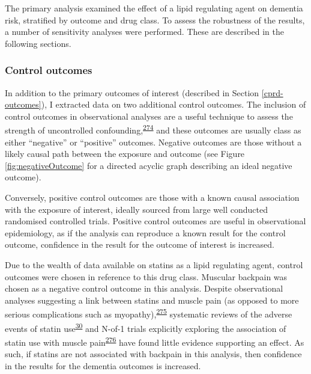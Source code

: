 \documentclass[a4paper, twoside]{templates/ociamthesis}
\begin{document}
The primary analysis examined the effect of a lipid regulating agent on dementia risk, stratified by outcome and drug class. To assess the robustness of the results, a number of sensitivity analyses were performed. These are described in the following sections.

\hypertarget{control-outcomes}{%
\subsubsection{Control outcomes}\label{control-outcomes}}

In addition to the primary outcomes of interest (described in Section \ref{cprd-outcomes}), I extracted data on two additional control outcomes. The inclusion of control outcomes in observational analyses are a useful technique to assess the strength of uncontrolled confounding,\textsuperscript{\protect\hyperlink{ref-lipsitch2010}{274}} and these outcomes are usually class as either ``negative'' or ``positive'' outcomes. Negative outcomes are those without a likely causal path between the exposure and outcome (see Figure \ref{fig:negativeOutcome} for a directed acyclic graph describing an ideal negative outcome).

Conversely, positive control outcomes are those with a known causal association with the exposure of interest, ideally sourced from large well conducted randomised controlled trials. Positive control outcomes are useful in observational epidemiology, as if the analysis can reproduce a known result for the control outcome, confidence in the result for the outcome of interest is increased.

Due to the wealth of data available on statins as a lipid regulating agent, control outcomes were chosen in reference to this drug class. Muscular backpain was chosen as a negative control outcome in this analysis. Despite observational analyses suggesting a link between statins and muscle pain (as opposed to more serious complications such as myopathy),\textsuperscript{\protect\hyperlink{ref-selva-ocallaghan2018}{275}} systematic reviews of the adverse events of statin use\textsuperscript{\protect\hyperlink{ref-collins2016a}{30}} and N-of-1 trials explicitly exploring the association of statin use with muscle pain\textsuperscript{\protect\hyperlink{ref-herrett2021}{276}} have found little evidence supporting an effect. As such, if statins are not associated with backpain in this analysis, then confidence in the results for the dementia outcomes is increased.
\end{document}

